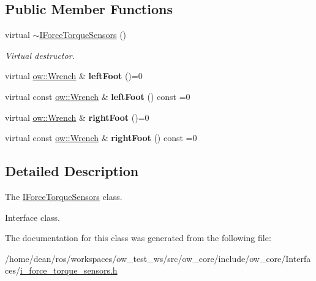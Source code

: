 \subsection*{Public Member Functions}
\begin{DoxyCompactItemize}
\item 
virtual \hyperlink{classow__core_1_1IForceTorqueSensors_a5b8464f5654189aca50e83b0bb7b6691}{$\sim$\+I\+Force\+Torque\+Sensors} ()\hypertarget{classow__core_1_1IForceTorqueSensors_a5b8464f5654189aca50e83b0bb7b6691}{}\label{classow__core_1_1IForceTorqueSensors_a5b8464f5654189aca50e83b0bb7b6691}

\begin{DoxyCompactList}\small\item\em Virtual destructor. \end{DoxyCompactList}\item 
virtual \hyperlink{classow__core_1_1Wrench}{ow\+::\+Wrench} \& {\bfseries left\+Foot} ()=0\hypertarget{classow__core_1_1IForceTorqueSensors_af653630db1ff0b80c86175f056bced30}{}\label{classow__core_1_1IForceTorqueSensors_af653630db1ff0b80c86175f056bced30}

\item 
virtual const \hyperlink{classow__core_1_1Wrench}{ow\+::\+Wrench} \& {\bfseries left\+Foot} () const =0\hypertarget{classow__core_1_1IForceTorqueSensors_a6f9d3ac17d105ea6a6757d6234fd6b32}{}\label{classow__core_1_1IForceTorqueSensors_a6f9d3ac17d105ea6a6757d6234fd6b32}

\item 
virtual \hyperlink{classow__core_1_1Wrench}{ow\+::\+Wrench} \& {\bfseries right\+Foot} ()=0\hypertarget{classow__core_1_1IForceTorqueSensors_a84f4368356a72384774518a088081390}{}\label{classow__core_1_1IForceTorqueSensors_a84f4368356a72384774518a088081390}

\item 
virtual const \hyperlink{classow__core_1_1Wrench}{ow\+::\+Wrench} \& {\bfseries right\+Foot} () const =0\hypertarget{classow__core_1_1IForceTorqueSensors_a83cb0dd072bc3b05c253ca48fb78311f}{}\label{classow__core_1_1IForceTorqueSensors_a83cb0dd072bc3b05c253ca48fb78311f}

\end{DoxyCompactItemize}


\subsection{Detailed Description}
The \hyperlink{classow__core_1_1IForceTorqueSensors}{I\+Force\+Torque\+Sensors} class. 

Interface class. 

The documentation for this class was generated from the following file\+:\begin{DoxyCompactItemize}
\item 
/home/dean/ros/workspaces/ow\+\_\+test\+\_\+ws/src/ow\+\_\+core/include/ow\+\_\+core/\+Interfaces/\hyperlink{i__force__torque__sensors_8h}{i\+\_\+force\+\_\+torque\+\_\+sensors.\+h}\end{DoxyCompactItemize}

